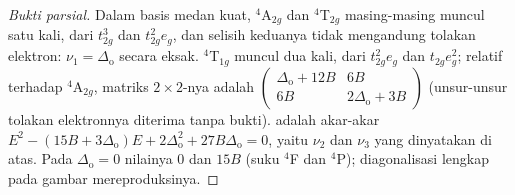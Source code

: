 \begin{proof}[Bukti parsial]
Dalam basis medan kuat, $^4$A$_{2g}$ dan $^4$T$_{2g}$ masing-masing muncul satu kali, dari $t_{2g}^3$ dan $t_{2g}^2e_g$, dan
selisih keduanya tidak mengandung tolakan elektron: $\nu_1 = \Delta_{\mathrm o}$ secara eksak. $^4$T$_{1g}$ muncul
dua kali, dari $t_{2g}^2e_g$ dan $t_{2g}e_g^2$; relatif terhadap $^4$A$_{2g}$, matriks $2\times2$-nya adalah
$\begin{pmatrix}\Delta_{\mathrm o} + 12B & 6B\\ 6B & 2\Delta_{\mathrm o} + 3B\end{pmatrix}$ (unsur-unsur tolakan elektronnya diterima tanpa bukti).
 adalah akar-akar $E^2 - (15B + 3\Delta_{\mathrm o})E + 2\Delta_{\mathrm o}^2 + 27B\Delta_{\mathrm o} = 0$, yaitu
$\nu_2$ dan $\nu_3$ yang dinyatakan di atas. Pada $\Delta_{\mathrm o} = 0$ nilainya 0 dan $15B$ (suku $^4$F dan $^4$P); diagonalisasi
lengkap pada gambar mereproduksinya.
\end{proof}

